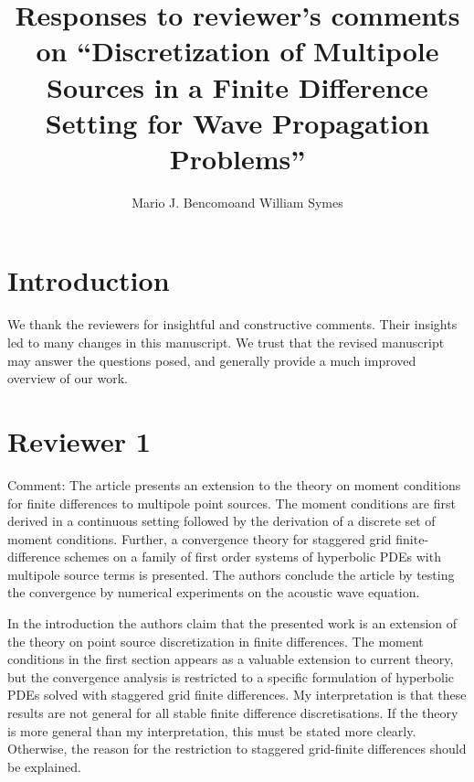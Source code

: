 \title{Responses to reviewer's comments on ``Discretization of Multipole Sources in a Finite Difference Setting for Wave Propagation Problems''}
\date{}
\address{
        \footnotemark[1]Institute for Computational and Experimental Research in Mathematics,\\ Brown University,\\ Providence, RI 02912 USA\\
        \footnotemark[2]The Rice Inversion Project,\\ Rice University,\\ Houston, TX
        77005-1892 USA
}
\author{Mario J. Bencomo\footnotemark[1] and William Symes\footnotemark[2]}


\maketitle
\parskip 12pt
\section{Introduction}
We thank the reviewers for insightful and constructive comments. Their insights led to many changes in this manuscript. We trust that the revised manuscript may answer the questions posed, and generally provide a much improved overview of our work.

\section{Reviewer 1}

Comment: The article presents an extension to the theory on moment conditions for finite differences to multipole point sources. The moment conditions are first derived in a continuous setting followed by the derivation of a discrete set of moment conditions. Further, a convergence theory for staggered grid finite-difference schemes on a family of first order systems of hyperbolic PDEs with multipole source terms is presented. The authors conclude the article by testing the convergence by numerical experiments on the acoustic wave equation.

In the introduction the authors claim that the presented work is an extension of the theory on point source discretization in finite differences. The moment conditions in the first section appears as a valuable extension to current theory, but the convergence analysis is restricted to a specific formulation of hyperbolic PDEs solved with staggered grid finite differences. My interpretation is that these results are not general for all stable finite difference discretisations. If the theory is more general than my interpretation, this must be stated more clearly. Otherwise, the reason for the restriction to staggered grid-finite differences should be explained.

